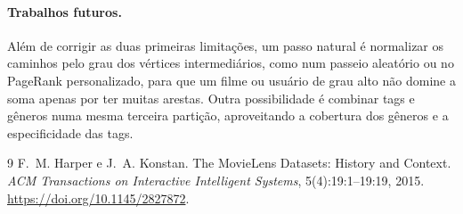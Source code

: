 \documentclass[12pt,a4paper]{article}
\theoremstyle{definition}
\begin{document}
\paragraph{Trabalhos futuros.}
Além de corrigir as duas primeiras limitações, um passo natural é
normalizar os caminhos pelo grau dos vértices intermediários, como num
passeio aleatório ou no PageRank personalizado, para que um filme ou
usuário de grau alto não domine a soma apenas por ter muitas arestas.
Outra possibilidade é combinar tags e gêneros numa mesma terceira
partição, aproveitando a cobertura dos gêneros e a especificidade das
tags.


\begin{thebibliography}{9}
F.~M. Harper e J.~A. Konstan.
\newblock The MovieLens Datasets: History and Context.
\newblock \emph{ACM Transactions on Interactive Intelligent Systems},
5(4):19:1--19:19, 2015. \url{https://doi.org/10.1145/2827872}.
\end{thebibliography}
\end{document}

